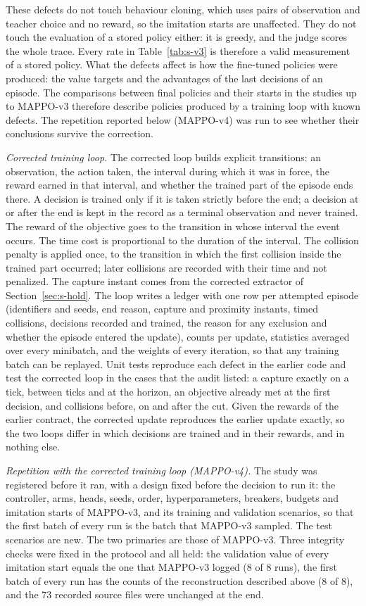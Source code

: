 \documentclass[preprint,12pt]{elsarticle}
\begin{document}
These defects do not touch behaviour cloning, which uses pairs of observation and teacher choice and no reward, so
the imitation starts are unaffected. They do not touch the evaluation of a stored policy either: it is greedy, and
the judge scores the whole trace. Every rate in Table~\ref{tab:s-v3} is therefore a valid measurement of a stored
policy. What the defects affect is how the fine-tuned policies were produced: the value targets and the advantages of
the last decisions of an episode. The comparisons between final policies and their starts in the studies up to
MAPPO-v3 therefore describe policies produced by a training loop with known defects. The repetition reported below
(MAPPO-v4) was run to see whether their conclusions survive the correction.

\emph{Corrected training loop.} The corrected loop builds explicit transitions: an observation, the action taken,
the interval during which it was in force, the reward earned in that interval, and whether the trained part of the
episode ends there. A decision is trained only if it is taken strictly before the end; a decision at or after the
end is kept in the record as a terminal observation and never trained. The reward of the objective goes to the
transition in whose interval the event occurs. The time cost is proportional to the duration of the interval. The
collision penalty is applied once, to the transition in which the first collision inside the trained part occurred;
later collisions are recorded with their time and not penalized. The capture instant comes from the corrected
extractor of Section~\ref{sec:s-hold}. The loop writes a ledger with one row per attempted episode (identifiers and
seeds, end reason, capture and proximity instants, timed collisions, decisions recorded and trained, the reason for
any exclusion and whether the episode entered the update), counts per update, statistics averaged over every
minibatch, and the weights of every iteration, so that any training batch can be replayed. Unit tests reproduce each
defect in the earlier code and test the corrected loop in the cases that the audit listed: a capture exactly on a
tick, between ticks and at the horizon, an objective already met at the first decision, and collisions before, on
and after the cut. Given the rewards of the earlier contract, the corrected update reproduces the earlier update
exactly, so the two loops differ in which decisions are trained and in their rewards, and in nothing else.

\emph{Repetition with the corrected training loop (MAPPO-v4).} The study was registered before it ran, with a
design fixed before the decision to run it: the controller, arms, heads, seeds, order, hyperparameters, breakers,
budgets and imitation starts of MAPPO-v3, and its training and validation scenarios, so that the first batch of
every run is the batch that MAPPO-v3 sampled. The test scenarios are new. The two primaries are those of MAPPO-v3.
Three integrity checks were fixed in the protocol and all held: the validation value of every imitation start equals
the one that MAPPO-v3 logged (8 of 8 runs), the first batch of every run has the counts of the reconstruction
described above (8 of 8), and the 73 recorded source files were unchanged at the end.
\end{document}
